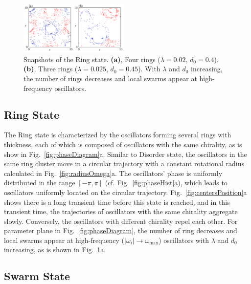 \documentclass[%
 aip,
 amsmath,amssymb,
 reprint,%
]{revtex4-1}
\begin{document}
\begin{figure}
    \includegraphics[width=0.48\textwidth]{./figs/ringStateNum.pdf}
    \caption{
        \label{fig:ringStateNum} Snapshots of the Ring state. 
        \textbf{(a)}, Four rings ($\lambda=0.02$, $d_0=0.4$). 
        \textbf{(b)}, Three rings ($\lambda=0.025$, $d_0=0.45$).
        With $\lambda$ and $d_0$ increasing, the number of rings decreases and local swarms appear at high-frequency oscillators.
    }
\end{figure}

\subsection{Ring State}

The Ring state is characterized by the oscillators forming several rings with thickness, each of which is composed of oscillators with the same chirality, as is show in Fig.~\ref{fig:phaseDiagram}a. 
Similar to Disorder state, the oscillators in the same ring cluster move in a circular trajectory with a constant rotational radius calculated in Fig.~\ref{fig:radiusOmega}a. 
The oscillators' phase is uniformly distributed in the range $\left[ -\pi,\pi \right]$ (cf. Fig.~\ref{fig:phaseHist}a), which leads to oscillators uniformly located on the circular trajectory.
Fig.~\ref{fig:centersPosition}a shows there is a long transient time before this state is reached, and in this transient time, the trajectories of oscillators with the same chirality aggregate slowly. Conversely, the oscillators with different chirality repel each other. 
For parameter plane in Fig.~\ref{fig:phaseDiagram}, the number of ring decreases and local swarms appear at high-frequency ($\left|\omega_i\right|\rightarrow \omega_{\max}$) oscillators with $\lambda$ and $d_0$ increasing, as is shown in Fig.~\ref{fig:ringStateNum}a. 


\subsection{Swarm State}
\end{document}
